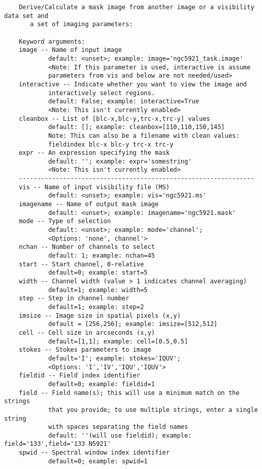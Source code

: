 \small
\begin{verbatim}
    Derive/Calculate a mask image from another image or a visibility data set and 
       a set of imaging parameters:
    
    Keyword arguments:
    image -- Name of input image
            default: <unset>; example: image='ngc5921_task.image'
            <Note: If this parameter is used, interactive is assume
            parameters from vis and below are not needed/used>
    interactive -- Indicate whether you want to view the image and
            interactively select regions.
            default: False; example: interactive=True
            <Note: This isn't currently enabled>
    cleanbox -- List of [blc-x,blc-y,trc-x,trc-y] values
            default: []; example: cleanbox=[110,110,150,145]
            Note: This can also be a filename with clean values:
            fieldindex blc-x blc-y trc-x trc-y
    expr -- An expression specifying the mask
            default: ''; example: expr='somestring'
            <Note: This isn't currently enabled>
    ----------------------------------------------------------------
    vis -- Name of input visibility file (MS)
            default: <unset>; example: vis='ngc5921.ms'
    imagename -- Name of output mask image
            default: <unset>; example: imagename='ngc5921.mask'
    mode -- Type of selection 
            default: <unset>; example: mode='channel'; 
            <Options: 'none', channel'>
    nchan -- Number of channels to select
            default: 1; example: nchan=45
    start -- Start channel, 0-relative
            default=0; example: start=5
    width -- Channel width (value > 1 indicates channel averaging)
            default=1; example: width=5
    step -- Step in channel number
            default=1; example: step=2      
    imsize -- Image size in spatial pixels (x,y)
            default = [256,256]; example: imsize=[512,512]
    cell -- Cell size in arcseconds (x,y)
            default=[1,1]; example: cell=[0.5,0.5]
    stokes -- Stokes parameters to image
            default='I'; example: stokes='IQUV'; 
            <Options: 'I','IV','IQU','IQUV'>
    fieldid -- Field index identifier
            default=0; example: fieldid=1
    field -- Field name(s); this will use a minimum match on the strings
            that you provide; to use multiple strings, enter a single string
            with spaces separating the field names
            default: ''(will use fieldid); example: field='133',field='133 N5921'
    spwid -- Spectral window index identifier
            default=0; example: spwid=1
\end{verbatim}
\normalsize


